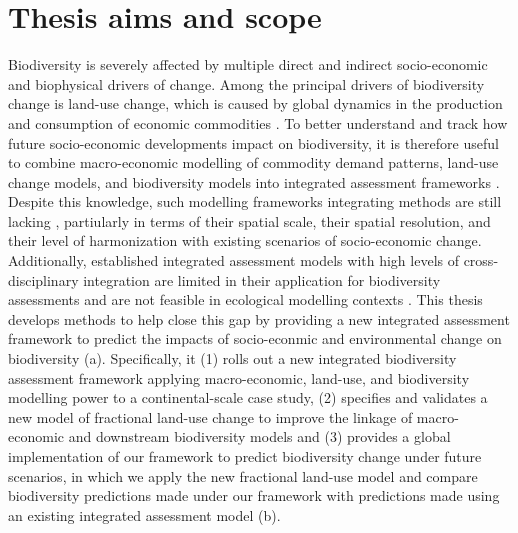 \section{Thesis aims and scope}
Biodiversity is severely affected by multiple direct and indirect socio-economic and biophysical drivers of change. Among the principal drivers of biodiversity change is land-use change, which is caused by global dynamics in the production and consumption of economic commodities \citep{ipbes_summary_2019}. To better understand and track how future socio-economic developments impact on biodiversity, it is therefore useful to combine macro-economic modelling of commodity demand patterns, land-use change models, and biodiversity models into integrated assessment frameworks \citep{ipbes_summary_2016, kapitza_assessing_2021}. Despite this knowledge, such modelling frameworks integrating methods are still lacking \citep{titeux_global_2017}, partiularly in terms of their spatial scale, their spatial resolution, and their level of harmonization with existing scenarios of socio-economic change. Additionally, established integrated assessment models with high levels of cross-disciplinary integration are limited in their application for biodiversity assessments and are not feasible in ecological modelling contexts \citep{hauck_reviewing_2015, veerkamp_future_2020}.
This thesis develops methods to help close this gap by providing a new integrated assessment framework to predict the impacts of socio-econmic and environmental change on biodiversity (a). Specifically, it (1) rolls out a new integrated biodiversity assessment framework applying macro-economic, land-use, and biodiversity modelling power to a continental-scale case study, (2) specifies and validates a new model of fractional land-use change to improve the linkage of macro-economic and downstream biodiversity models and (3) provides a global implementation of our framework to predict biodiversity change under future scenarios, in which we apply the new fractional land-use model and compare biodiversity predictions made under our framework with predictions made using an existing integrated assessment model (b).

